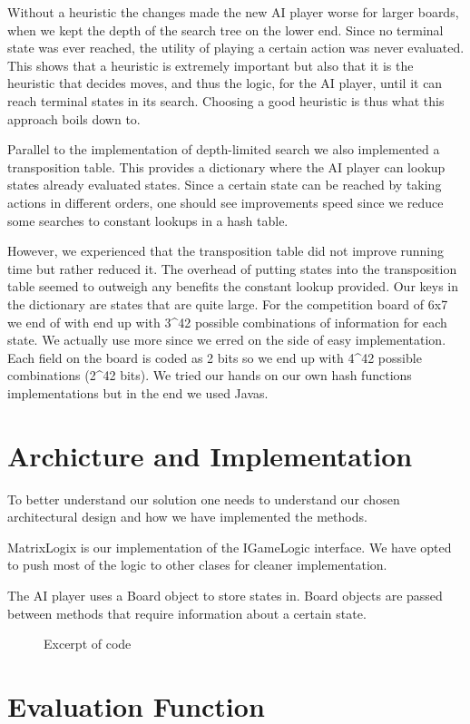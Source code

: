 \documentclass[11pt, a4paper]{article}
\begin{document}
Without a heuristic the changes made the new AI player worse for larger boards,
when we kept the depth of the search tree on the lower end. Since no terminal
state was ever reached, the utility of playing a certain action was never
evaluated. This shows that a heuristic is extremely important but also that it
is the heuristic that decides moves, and thus the logic, for the AI player,
until it can reach terminal states in its search. Choosing a good heuristic is
thus what this approach boils down to.

Parallel to the implementation of depth-limited search we also implemented a
transposition table. This provides a dictionary where the AI player can lookup
states already evaluated states. Since a certain state can be reached by taking
actions in different orders, one should see improvements speed since we
reduce some searches to constant lookups in a hash table. 

However, we experienced that the transposition table did not improve running
time but rather reduced it. The overhead of putting states into the
transposition table seemed to outweigh any benefits the constant lookup
provided. Our keys in the dictionary are states that are quite large. For the
competition board of 6x7 we end of with end up with 3^42 possible combinations
of information for each state. We actually use more since we erred on the side
of easy implementation. Each field on the board is coded as 2 bits so we end up
with 4^42 possible combinations (2^42 bits). We tried our hands on our own hash
functions implementations but in the end we used Javas.

\section*{Archicture and Implementation}
To better understand our solution one needs to understand our chosen
architectural design and how we have implemented the methods.

MatrixLogix is our implementation of the IGameLogic interface. We have opted to
push most of the logic to other clases for cleaner implementation.

The AI player uses a Board object to store states in. Board objects are passed
between methods that require information about a certain state.




 



\begin{figure}

\caption{ Excerpt of code}\label{label1}
\end{figure}


\section*{Evaluation Function}
\end{document}
